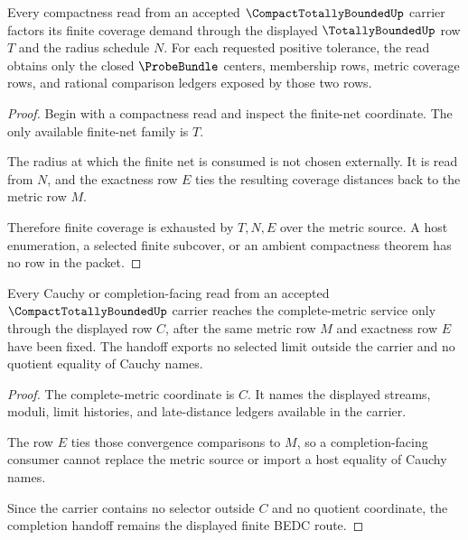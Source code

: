 \begin{theorem}
\label{thm:compact-totally-bounded-finite-net-exhaustion}
Every compactness read from an accepted $\CompactTotallyBoundedUp$ carrier factors its finite coverage demand through the displayed $\TotallyBoundedUp$ row $T$ and the radius schedule $N$. For each requested positive tolerance, the read obtains only the closed $\ProbeBundle$ centers, membership rows, metric coverage rows, and rational comparison ledgers exposed by those two rows.
\end{theorem}
\begin{proof}
Begin with a compactness read and inspect the finite-net coordinate. The only available finite-net family is $T$.

The radius at which the finite net is consumed is not chosen externally. It is read from $N$, and the exactness row $E$ ties the resulting coverage distances back to the metric row $M$.

Therefore finite coverage is exhausted by $T,N,E$ over the metric source. A host enumeration, a selected finite subcover, or an ambient compactness theorem has no row in the packet.
\end{proof}

\begin{theorem}
\label{thm:compact-totally-bounded-completion-handoff}
Every Cauchy or completion-facing read from an accepted $\CompactTotallyBoundedUp$ carrier reaches the complete-metric service only through the displayed row $C$, after the same metric row $M$ and exactness row $E$ have been fixed. The handoff exports no selected limit outside the carrier and no quotient equality of Cauchy names.
\end{theorem}
\begin{proof}
The complete-metric coordinate is $C$. It names the displayed streams, moduli, limit histories, and late-distance ledgers available in the carrier.

The row $E$ ties those convergence comparisons to $M$, so a completion-facing consumer cannot replace the metric source or import a host equality of Cauchy names.

Since the carrier contains no selector outside $C$ and no quotient coordinate, the completion handoff remains the displayed finite BEDC route.
\end{proof}

